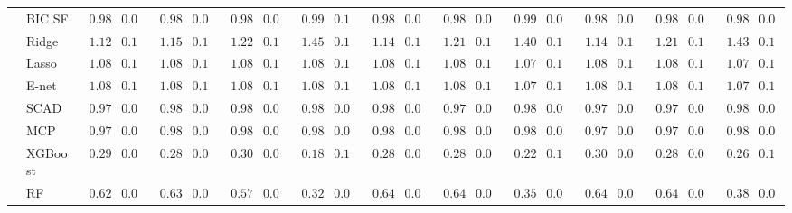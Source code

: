 \begin{tabular}{p{0.2cm}p{1cm}|p{0.6cm}p{0.6cm}|p{0.6cm}p{0.6cm}p{0.6cm}p{0.6cm}p{0.6cm}p{0.6cm}|p{0.6cm}p{0.6cm}p{0.6cm}p{0.6cm}p{0.6cm}p{0.6cm}|p{0.6cm}p{0.6cm}p{0.6cm}p{0.6cm}p{0.6cm}p{0.6cm}}
 & BIC SF  & $\phantom{0}0.98$ & $0.09$ & $\phantom{0}0.98$ & $0.09$ & $\phantom{0}0.98$ & $0.09$ & $\phantom{0}0.99$ & $0.10$ & $\phantom{0}0.98$ & $0.09$ & $\phantom{0}0.98$ & $0.09$ & $\phantom{0}0.99$ & $0.09$ & $\phantom{0}0.98$ & $0.09$ & $\phantom{0}0.98$ & $0.09$ & $\phantom{0}0.98$ & $0.09$ \\
 & Ridge  & $\phantom{0}1.12$ & $0.11$ & $\phantom{0}1.15$ & $0.10$ & $\phantom{0}1.22$ & $0.11$ & $\phantom{0}1.45$ & $0.13$ & $\phantom{0}1.14$ & $0.10$ & $\phantom{0}1.21$ & $0.11$ & $\phantom{0}1.40$ & $0.12$ & $\phantom{0}1.14$ & $0.11$ & $\phantom{0}1.21$ & $0.10$ & $\phantom{0}1.43$ & $0.12$ \\
 & Lasso  & $\phantom{0}1.08$ & $0.11$ & $\phantom{0}1.08$ & $0.11$ & $\phantom{0}1.08$ & $0.11$ & $\phantom{0}1.08$ & $0.11$ & $\phantom{0}1.08$ & $0.11$ & $\phantom{0}1.08$ & $0.11$ & $\phantom{0}1.07$ & $0.11$ & $\phantom{0}1.08$ & $0.11$ & $\phantom{0}1.08$ & $0.11$ & $\phantom{0}1.07$ & $0.11$ \\
 & E-net  & $\phantom{0}1.08$ & $0.11$ & $\phantom{0}1.08$ & $0.11$ & $\phantom{0}1.08$ & $0.11$ & $\phantom{0}1.08$ & $0.11$ & $\phantom{0}1.08$ & $0.11$ & $\phantom{0}1.08$ & $0.11$ & $\phantom{0}1.07$ & $0.11$ & $\phantom{0}1.08$ & $0.11$ & $\phantom{0}1.08$ & $0.11$ & $\phantom{0}1.07$ & $0.11$ \\
 & SCAD  & $\phantom{0}0.97$ & $0.09$ & $\phantom{0}0.98$ & $0.09$ & $\phantom{0}0.98$ & $0.09$ & $\phantom{0}0.98$ & $0.09$ & $\phantom{0}0.98$ & $0.09$ & $\phantom{0}0.97$ & $0.09$ & $\phantom{0}0.98$ & $0.09$ & $\phantom{0}0.97$ & $0.09$ & $\phantom{0}0.97$ & $0.09$ & $\phantom{0}0.98$ & $0.09$ \\
 & MCP  & $\phantom{0}0.97$ & $0.09$ & $\phantom{0}0.98$ & $0.09$ & $\phantom{0}0.98$ & $0.09$ & $\phantom{0}0.98$ & $0.09$ & $\phantom{0}0.98$ & $0.09$ & $\phantom{0}0.98$ & $0.09$ & $\phantom{0}0.98$ & $0.09$ & $\phantom{0}0.97$ & $0.09$ & $\phantom{0}0.97$ & $0.09$ & $\phantom{0}0.98$ & $0.09$ \\
 & XGBoost  & $\phantom{0}0.29$ & $0.08$ & $\phantom{0}0.28$ & $0.09$ & $\phantom{0}0.30$ & $0.07$ & $\phantom{0}0.18$ & $0.17$ & $\phantom{0}0.28$ & $0.08$ & $\phantom{0}0.28$ & $0.08$ & $\phantom{0}0.22$ & $0.16$ & $\phantom{0}0.30$ & $0.07$ & $\phantom{0}0.28$ & $0.09$ & $\phantom{0}0.26$ & $0.15$ \\
 & RF  & $\phantom{0}0.62$ & $0.06$ & $\phantom{0}0.63$ & $0.06$ & $\phantom{0}0.57$ & $0.05$ & $\phantom{0}0.32$ & $0.03$ & $\phantom{0}0.64$ & $0.05$ & $\phantom{0}0.64$ & $0.05$ & $\phantom{0}0.35$ & $0.03$ & $\phantom{0}0.64$ & $0.05$ & $\phantom{0}0.64$ & $0.05$ & $\phantom{0}0.38$ & $0.04$ \\

\end{tabular}
